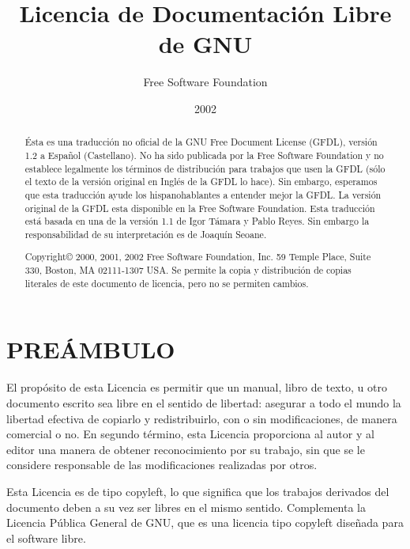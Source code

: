 \documentclass[letterpaper,12pt,titlepage]{article}
\title{Licencia de Documentación Libre de GNU}
\author{Free Software Foundation}
\date{2002}
\begin{document}

\maketitle        %

\addtolength{\parskip}{\baselineskip}

\begin{abstract}
Ésta es una traducción no oficial de la GNU Free Document License (GFDL), versión 1.2 a Español (Castellano). No ha sido publicada por la Free Software Foundation y no establece legalmente los términos de distribución para trabajos que usen la GFDL (sólo el texto de la versión original en Inglés de la GFDL lo hace). Sin embargo, esperamos que esta traducción ayude los hispanohablantes a entender mejor la GFDL. La versión original de la GFDL esta disponible en la Free Software Foundation. Esta traducción está basada en una de la versión 1.1 de Igor Támara y Pablo Reyes. Sin embargo la responsabilidad de su interpretación es de Joaquín Seoane.\par

Copyright© 2000, 2001, 2002 Free Software Foundation, Inc. 59 Temple Place, Suite 330, Boston, MA 02111-1307 USA. Se permite la copia y distribución de copias literales de este documento de licencia, pero no se permiten cambios.\par
\end{abstract}

\section{PREÁMBULO}

El propósito de esta Licencia es permitir que un manual, libro de texto, u otro documento escrito sea libre en el sentido de libertad: asegurar a todo el mundo la libertad efectiva de copiarlo y redistribuirlo, con o sin modificaciones, de manera comercial o no. En segundo término, esta Licencia proporciona al autor y al editor una manera de obtener reconocimiento por su trabajo, sin que se le considere responsable de las modificaciones realizadas por otros.\par

Esta Licencia es de tipo copyleft, lo que significa que los trabajos derivados del documento deben a su vez ser libres en el mismo sentido. Complementa la Licencia Pública General de GNU, que es una licencia tipo copyleft diseñada para el software libre.\par
\end{document}
